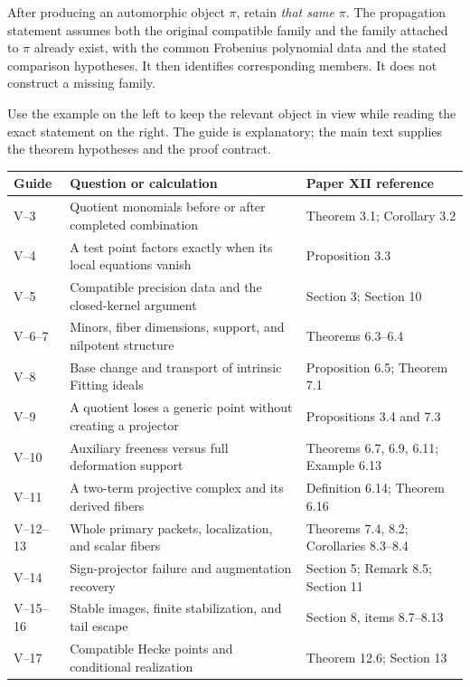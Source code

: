 After producing an automorphic object $\pi$, retain \emph{that same} $\pi$. The propagation statement assumes both the original compatible family and the family attached to $\pi$ already exist, with the common Frobenius polynomial data and the stated comparison hypotheses. It then identifies corresponding members. It does not construct a missing family.


Use the example on the left to keep the relevant object in view while reading the exact statement on the right. The guide is explanatory; the main text supplies the theorem hypotheses and the proof contract.

{\small
\begin{tabularx}{\linewidth}{@{}p{.12\linewidth}Yp{.30\linewidth}@{}}\toprule
\textbf{Guide} & \textbf{Question or calculation} & \textbf{Paper XII reference}\\\midrule
V--3 & Quotient monomials before or after completed combination & Theorem 3.1; Corollary 3.2\\
V--4 & A test point factors exactly when its local equations vanish & Proposition 3.3\\
V--5 & Compatible precision data and the closed-kernel argument & Section 3; Section 10\\
V--6--7 & Minors, fiber dimensions, support, and nilpotent structure & Theorems 6.3--6.4\\
V--8 & Base change and transport of intrinsic Fitting ideals & Proposition 6.5; Theorem 7.1\\
V--9 & A quotient loses a generic point without creating a projector & Propositions 3.4 and 7.3\\
V--10 & Auxiliary freeness versus full deformation support & Theorems 6.7, 6.9, 6.11; Example 6.13\\
V--11 & A two-term projective complex and its derived fibers & Definition 6.14; Theorem 6.16\\
V--12--13 & Whole primary packets, localization, and scalar fibers & Theorems 7.4, 8.2; Corollaries 8.3--8.4\\
V--14 & Sign-projector failure and augmentation recovery & Section 5; Remark 8.5; Section 11\\
V--15--16 & Stable images, finite stabilization, and tail escape & Section 8, items 8.7--8.13\\
V--17 & Compatible Hecke points and conditional realization & Theorem 12.6; Section 13\\\bottomrule
\end{tabularx}}

